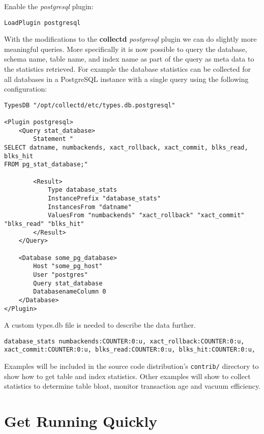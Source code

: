 \documentclass[a4paper,twoside,12pt]{article}
\begin{document}
Enable the \textit{postgresql} plugin:
\lstset{language=xml}
\begin{lstlisting}
LoadPlugin postgresql
\end{lstlisting}

With the modifications to the \textbf{collectd} \textit{postgresql} plugin we
can do slightly more meaningful queries.  More specifically it is now possible
to query the database, schema name, table name, and index name as part of the
query as meta data to the statistics retrieved.  For example the database
statistics can be collected for all databases in a PostgreSQL instance with a
single query using the following configuration:
\lstset{language=xml}
\begin{lstlisting}
TypesDB "/opt/collectd/etc/types.db.postgresql"

<Plugin postgresql>
    <Query stat_database>
        Statement "
SELECT datname, numbackends, xact_rollback, xact_commit, blks_read, blks_hit
FROM pg_stat_database;"

        <Result>
            Type database_stats
            InstancePrefix "database_stats"
            InstancesFrom "datname"
            ValuesFrom "numbackends" "xact_rollback" "xact_commit" "blks_read" "blks_hit"
        </Result>
    </Query>

    <Database some_pg_database>
        Host "some_pg_host"
        User "postgres"
        Query stat_database
        DatabasenameColumn 0
    </Database>
</Plugin>
\end{lstlisting}

A custom types.db file is needed to describe the data further.
\lstset{language=clean}
\begin{lstlisting}
database_stats numbackends:COUNTER:0:u, xact_rollback:COUNTER:0:u, xact_commit:COUNTER:0:u, blks_read:COUNTER:0:u, blks_hit:COUNTER:0:u,
\end{lstlisting}

Examples will be included in the source code distribution's \texttt{contrib/}
directory to show how to get table and index statistics.  Other examples will
show to collect statistics to determine table bloat, monitor transaction age
and vacuum efficiency.

\section{Get Running Quickly}
\end{document}
